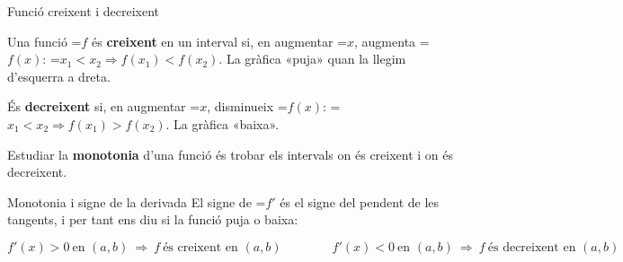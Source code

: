 \documentclass[11pt,a4paper]{article}
\newcommand{\lt}{<}\newcommand{\gt}{>}
\newcommand{\fmm}[1]{\setbox0=\hbox{$#1$}\ifdim\wd0>\linewidth\[#1\]\else\mbox{\box0}\fi}
\begin{document}
  

  
\begin{fmdef}{Funció creixent i decreixent}
\par\noindent \begin{minipage}[t]{0.48\linewidth}\vspace{0pt}\raggedright Una funció \fmm{f} és \textbf{creixent} en un interval si, en augmentar \fmm{x}, augmenta \fmm{f(x)}: \fmm{x_1\lt x_2\Rightarrow f(x_1)\lt f(x_2)}. La gràfica «puja» quan la llegim d'esquerra a dreta.

          

És \textbf{decreixent} si, en augmentar \fmm{x}, disminueix \fmm{f(x)}: \fmm{x_1\lt x_2\Rightarrow f(x_1)\gt f(x_2)}. La gràfica «baixa».

          

Estudiar la \textbf{monotonia} d'una funció és trobar els intervals on és creixent i on és decreixent.\end{minipage}\hfill\begin{minipage}[t]{0.48\linewidth}\vspace{0pt}\raggedright \begin{center}\end{center}\end{minipage}\par\medskip
\end{fmdef}

  
\begin{fmprop}{Monotonia i signe de la derivada}
El signe de \fmm{f'} és el signe del pendent de les tangents, i per tant ens diu si la funció puja o baixa:

      
\[f'(x)\gt0\ \text{en }(a,b)\ \Rightarrow\ f\ \text{és creixent en }(a,b)\qquad\qquad f'(x)\lt0\ \text{en }(a,b)\ \Rightarrow\ f\ \text{és decreixent en }(a,b)\]

\end{fmprop}
\end{document}
